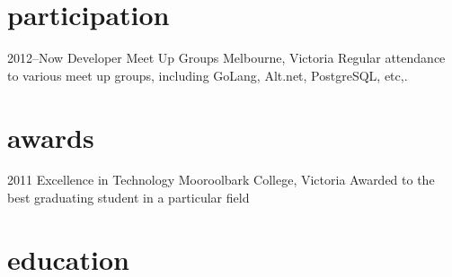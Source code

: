 \documentclass[]{friggeri-cv} %
\begin{document}
\pagebreak

\section{participation}

\begin{entrylist}

\entry
{2012--Now}
{Developer Meet Up Groups}
{Melbourne, Victoria}
{Regular attendance to various meet up groups, including GoLang, Alt.net,
PostgreSQL, etc,.}

\end{entrylist}

\section{awards}

\begin{entrylist}
\entry
{2011}
{Excellence in Technology}
{Mooroolbark College, Victoria}
{Awarded to the best graduating student in a particular field}
\end{entrylist}

\section{education}
\end{document}
